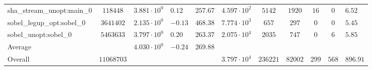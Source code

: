 \begin{tabular}{|l|c|HHc|c|c|c|c|cH|}
sha\_stream\_unopt:main\_0                      & $ 118448   $ & $ 3.881 \cdot 10^{0} $ & $ 0.12  $ & $ 257.67 $ & $ 4.597 \cdot 10^{2}  $ & $ 5142   $ & $ 1920  $ & $ 16  $ & $ 0   $ & $ 6.52    $ \\
sobel\_legup\_opt:sobel\_0                      & $ 3641402  $ & $ 2.135 \cdot 10^{0} $ & $ -0.13 $ & $ 468.38 $ & $ 7.774 \cdot 10^{3}  $ & $ 657    $ & $ 297   $ & $ 0   $ & $ 0   $ & $ 5.45    $ \\
sobel\_unopt:sobel\_0                           & $ 5463633  $ & $ 3.797 \cdot 10^{0} $ & $ 0.20  $ & $ 263.37 $ & $ 2.075 \cdot 10^{4}  $ & $ 2035   $ & $ 747   $ & $ 0   $ & $ 6   $ & $ 5.85    $ \\
\hline
Average                                         & $          $ & $ 4.030 \cdot 10^{0} $ & $ -0.24 $ & $ 269.88 $ & $                     $ & $        $ & $       $ & $     $ & $     $ & $         $ \\
\hline
Overall                                         & $ 11068703 $ & $                    $ & $       $ & $        $ & $ 3.797 \cdot 10^{4}  $ & $ 236221 $ & $ 82002 $ & $ 299 $ & $ 568 $ & $ 896.91  $ \\
\hline
\end{tabular}
